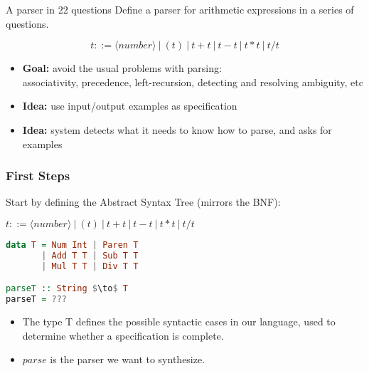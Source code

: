 \newcommand{\lsthaskell}[1]{\lstinline[language=haskell]{#1}}
\newcommand{\Q}{{\color{red}Q:}\hspace{2mm}}
\newcommand{\A}{{\color{blue}A:}\hspace{2mm}}

\begin{frame}{A parser in 22 questions}
  Define a parser for arithmetic expressions in a series of questions.

\[
  t ::= \langle number \rangle ~|~ ( t ) ~|~ t + t ~|~ t - t ~|~ t * t ~|~ t / t
\]

  \begin{itemize}
  \item{{\bf Goal:} avoid the usual problems with parsing:\\
      associativity, precedence, left-recursion, detecting and
      resolving ambiguity, etc}
  \item{{\bf Idea:} use input/output examples as specification}

  \item{{\bf Idea:} system detects what it needs to know how to parse,
      and asks for examples}
\end{itemize}
\end{frame}

\begin{frame}[fragile]
\frametitle{First Steps}

  Start by defining the Abstract Syntax Tree (mirrors the BNF):

\begin{center}
\begin{minipage}{.7\textwidth}
$t ::= \langle number \rangle ~|~ ( t ) ~|~ t + t ~|~ t - t ~|~ t * t ~|~ t / t$

\begin{lstlisting}[mathescape,language=haskell]
data T = Num Int | Paren T
       | Add T T | Sub T T
       | Mul T T | Div T T

parseT :: String $\to$ T
parseT = ???
\end{lstlisting}
\end{minipage}
\end{center}

\begin{itemize}
\item{The type T defines the possible syntactic cases in our language,
    used to determine whether a specification is complete.}
\item{$parse$ is the parser we want to synthesize.}
\end{itemize}
\end{frame}

